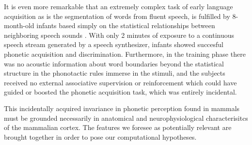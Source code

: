 {It is even more remarkable that an extremely complex task of early language acquisition as is the segmentation of words from fluent speech, is fulfilled by 8-month-old infants based simply on the statistical relationships between neighboring speech sounds \cite{Saffran1996StatisticalLB}. With only 2 minutes of exposure to a continuous speech stream generated by a speech synthesizer, infants showed succesful phonetic acquisition and discrimination. Furthermore, in the training phase there was no acoustic information about word boundaries beyond the statistical structure in the phonotactic rules immerse in the stimuli, and the subjects received no external associative supervision or reinforcement which could have guided or boosted the phonetic acquisition task, which was entirely incidental.

This incidentally acquired invariance in phonetic perception found in mammals must be grounded necessarily in anatomical and neurophysiological characterisitcs of the mammalian cortex. The features we foresee as potentially relevant are brought together in order to pose our computational hypotheses.
}















